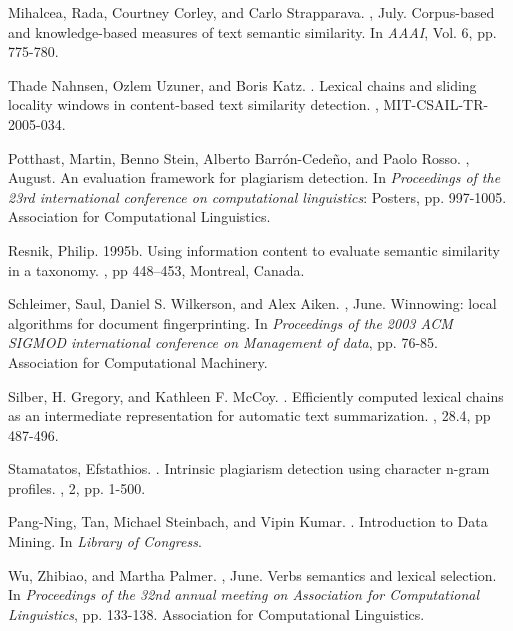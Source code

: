 \documentclass[11pt]{article}
\begin{document}
\begin{thebibliography}{}
Mihalcea, Rada, Courtney Corley, and Carlo Strapparava.
, July.
\newblock Corpus-based and knowledge-based measures of text semantic similarity.
\newblock In {\em AAAI}, Vol. 6, pp. 775-780.

Thade Nahnsen, Ozlem Uzuner, and Boris Katz.
.
\newblock Lexical chains and sliding locality windows in
content-based text similarity detection.
, MIT-CSAIL-TR-2005-034.

Potthast, Martin, Benno Stein, Alberto Barrón-Cedeño, and Paolo Rosso.
, August.
\newblock An evaluation framework for plagiarism detection.
\newblock In {\em Proceedings of the 23rd international conference on computational linguistics}: Posters, pp. 997-1005.
\newblock Association for Computational Linguistics.

Resnik, Philip.
\newblock 1995b.
\newblock Using information content to evaluate semantic similarity in a taxonomy.
, pp 448--453, Montreal,
Canada.

Schleimer, Saul, Daniel S. Wilkerson, and Alex Aiken.
, June.
\newblock Winnowing: local algorithms for document fingerprinting.
\newblock In {\em Proceedings of the 2003 ACM SIGMOD international conference on Management of data}, pp. 76-85. Association for Computational Machinery.

Silber, H. Gregory, and  Kathleen F. McCoy.
.
\newblock Efficiently computed lexical chains as an intermediate representation for automatic text summarization.
, 28.4, pp 487-496.

Stamatatos, Efstathios.
.
\newblock Intrinsic plagiarism detection using character n-gram profiles.
, 2, pp. 1-500.

Pang-Ning, Tan, Michael Steinbach, and Vipin Kumar.
.
\newblock Introduction to Data Mining.
\newblock In {\em Library of Congress}.

Wu, Zhibiao, and Martha Palmer.
, June.
\newblock Verbs semantics and lexical selection.
\newblock In {\em Proceedings of the 32nd annual meeting on Association for Computational Linguistics}, pp. 133-138.
\newblock Association for Computational Linguistics.

\end{thebibliography}
\end{document}
